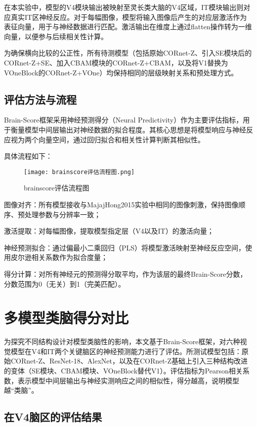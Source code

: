 在本实验中，模型的V4模块输出被映射至灵长类大脑的V4区域，IT模块输出则对应真实IT区神经反应。对于每幅图像，模型将输入图像后产生的对应层激活作为表征向量，用于与神经数据进行匹配。激活输出在维度上通过flatten操作转为一维向量，以便参与后续相关性计算。

为确保横向比较的公正性，所有待测模型（包括原始CORnet-Z、引入SE模块后的CORnet-Z+SE、加入CBAM模块的CORnet-Z+CBAM，以及将V1替换为VOneBlock的CORnet-Z+VOne）均保持相同的层级映射关系和预处理方式。

\subsection{评估方法与流程}

Brain-Score框架采用神经预测得分（Neural Predictivity）作为主要评估指标，用于衡量模型中间层输出对神经数据的拟合程度。其核心思想是将模型响应与神经反应视为两个向量空间，通过回归拟合和相关性计算判断其相似性。

具体流程如下：

\begin{figure}[hbt]
	\centering
	\texttt{[image: brainscore评估流程图.png]}
	\caption{brainscore评估流程图}
	\label{f.brainscore评估流程图}
\end{figure}

图像对齐：所有模型接收与MajajHong2015实验中相同的图像刺激，保持图像顺序、预处理参数与分辨率一致；

激活提取：对每幅图像，提取模型指定层（V4以及IT）的激活向量；

神经预测拟合：通过偏最小二乘回归（PLS）将模型激活映射至神经反应空间，使用皮尔逊相关系数作为拟合度量；

得分计算：对所有神经元的预测得分取平均，作为该层的最终Brain-Score分数，分数范围为0（无关）到1（完美匹配）。


\section{多模型类脑得分对比}

为探究不同结构设计对模型类脑性的影响，本文基于Brain-Score框架，对六种视觉模型在V4和IT两个关键脑区的神经预测能力进行了评估。所测试模型包括：原始CORnet-Z、ResNet-18、AlexNet，以及在CORnet-Z基础上引入三种结构改进的变体（SE模块、CBAM模块、VOneBlock替代V1）。评估指标为Pearson相关系数，表示模型中间层输出与神经实测响应之间的相似性，得分越高，说明模型越“类脑”。

\subsection{在V4脑区的评估结果}

